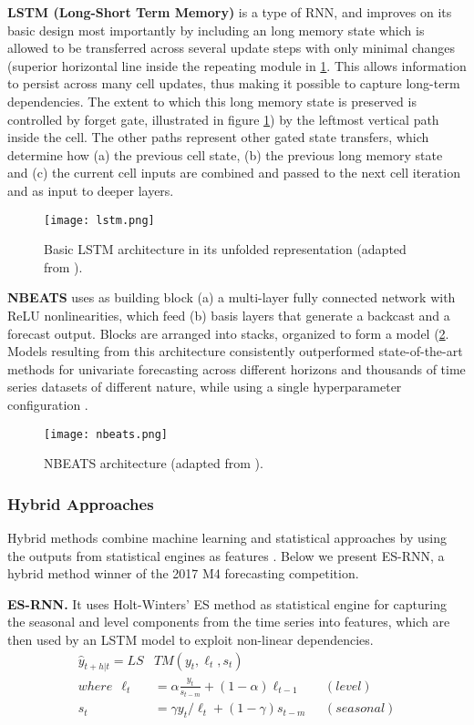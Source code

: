 \noindent
\textbf{LSTM (Long-Short Term Memory)} is a type of RNN, and improves on its basic design most importantly by including an long memory state which is allowed to be transferred across several update steps with only minimal changes (superior horizontal line inside the repeating module in \ref{fig:lstm}. This allows information to persist across many cell updates, thus making it possible to capture long-term dependencies. The extent to which this long memory state is preserved is controlled by forget gate, illustrated in figure \ref{fig:lstm}) by the leftmost vertical path inside the cell. The other paths represent other gated state transfers, which determine how (a) the previous cell state, (b) the previous long memory state and (c) the current cell inputs are combined and passed to the next cell iteration and as input to deeper layers.
\begin{figure}[H]
	\centering
    \caption{Basic LSTM architecture in its unfolded representation (adapted from \cite{paneru2015lstm}). }
    \texttt{[image: lstm.png]}
	\label{fig:lstm}
\end{figure}

\noindent
\textbf{NBEATS} uses as building block (a) a multi-layer fully connected network with ReLU nonlinearities, which feed (b) basis layers that generate a backcast and a forecast output. Blocks are arranged into stacks, organized to form a model (\ref{fig:nbeats}.  Models resulting from this architecture consistently outperformed state-of-the-art methods for univariate forecasting across different horizons and thousands of time series datasets of different nature, while using a single hyperparameter configuration \cite{oreshkin2019nbeats}.
\begin{figure}[H]
	\centering
    \caption{NBEATS architecture (adapted from \cite{oreshkin2019nbeats}).}
    \texttt{[image: nbeats.png]}
	\label{fig:nbeats}
\end{figure}

\subsubsection{Hybrid Approaches}
Hybrid methods combine machine learning and statistical approaches by using the outputs from statistical engines as features \cite{oreshkin2019nbeats}. Below we present ES-RNN, a hybrid method winner of the 2017 M4 forecasting competition.

\vspace{1em}
\noindent
\textbf{ES-RNN.} It uses Holt-Winters' ES method as statistical engine for capturing the seasonal and level components from the time series into features, which are then used by an LSTM model to exploit non-linear dependencies.
\begin{equation}\label{eq:esrnn}
    \begin{aligned}
    \hat{y}_{t+h|t} = LS&TM(y_t,\ell_t, s_t)\\
    where \ \ \ell_t &= \alpha \frac{y_t}{s_{t-m}} + (1-\alpha)\ell_{t-1}   &(level) \\
    s_t &= \gamma y_t/\ell_{t} + (1-\gamma)s_{t-m} \ \ \ &(seasonal)
    \end{aligned}
\end{equation}

